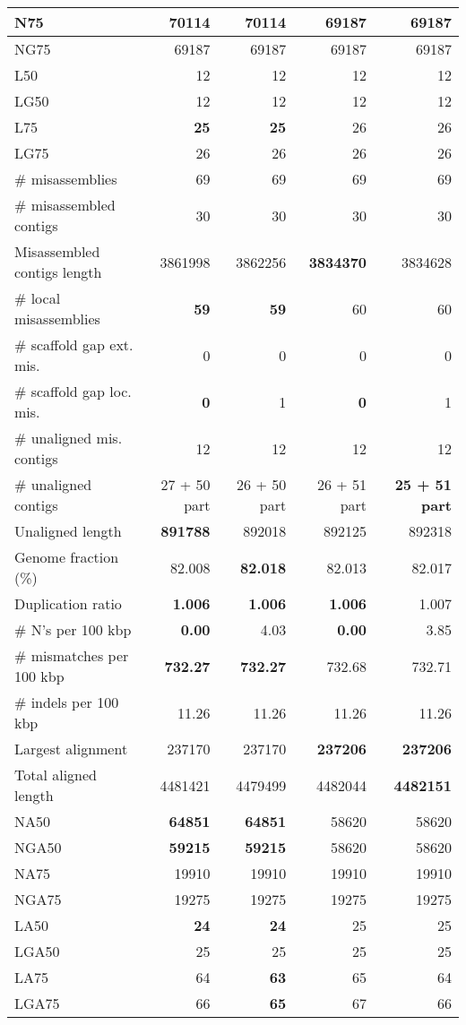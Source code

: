 \documentclass[12pt,a4paper]{article}
\begin{document}
\begin{table}[ht]
\begin{center}
\begin{tabular}{|l*{4}{|r}|}
N75 & {\bf 70114} & {\bf 70114} & 69187 & 69187 \\ \hline
NG75 & 69187 & 69187 & 69187 & 69187 \\ \hline
L50 & 12 & 12 & 12 & 12 \\ \hline
LG50 & 12 & 12 & 12 & 12 \\ \hline
L75 & {\bf 25} & {\bf 25} & 26 & 26 \\ \hline
LG75 & 26 & 26 & 26 & 26 \\ \hline
\# misassemblies & 69 & 69 & 69 & 69 \\ \hline
\# misassembled contigs & 30 & 30 & 30 & 30 \\ \hline
Misassembled contigs length & 3861998 & 3862256 & {\bf 3834370} & 3834628 \\ \hline
\# local misassemblies & {\bf 59} & {\bf 59} & 60 & 60 \\ \hline
\# scaffold gap ext. mis. & 0 & 0 & 0 & 0 \\ \hline
\# scaffold gap loc. mis. & {\bf 0} & 1 & {\bf 0} & 1 \\ \hline
\# unaligned mis. contigs & 12 & 12 & 12 & 12 \\ \hline
\# unaligned contigs & 27 + 50 part & 26 + 50 part & 26 + 51 part & {\bf 25 + 51 part} \\ \hline
Unaligned length & {\bf 891788} & 892018 & 892125 & 892318 \\ \hline
Genome fraction (\%) & 82.008 & {\bf 82.018} & 82.013 & 82.017 \\ \hline
Duplication ratio & {\bf 1.006} & {\bf 1.006} & {\bf 1.006} & 1.007 \\ \hline
\# N's per 100 kbp & {\bf 0.00} & 4.03 & {\bf 0.00} & 3.85 \\ \hline
\# mismatches per 100 kbp & {\bf 732.27} & {\bf 732.27} & 732.68 & 732.71 \\ \hline
\# indels per 100 kbp & 11.26 & 11.26 & 11.26 & 11.26 \\ \hline
Largest alignment & 237170 & 237170 & {\bf 237206} & {\bf 237206} \\ \hline
Total aligned length & 4481421 & 4479499 & 4482044 & {\bf 4482151} \\ \hline
NA50 & {\bf 64851} & {\bf 64851} & 58620 & 58620 \\ \hline
NGA50 & {\bf 59215} & {\bf 59215} & 58620 & 58620 \\ \hline
NA75 & 19910 & 19910 & 19910 & 19910 \\ \hline
NGA75 & 19275 & 19275 & 19275 & 19275 \\ \hline
LA50 & {\bf 24} & {\bf 24} & 25 & 25 \\ \hline
LGA50 & 25 & 25 & 25 & 25 \\ \hline
LA75 & 64 & {\bf 63} & 65 & 64 \\ \hline
LGA75 & 66 & {\bf 65} & 67 & 66 \\ \hline
\end{tabular}
\end{center}
\end{table}
\end{document}
